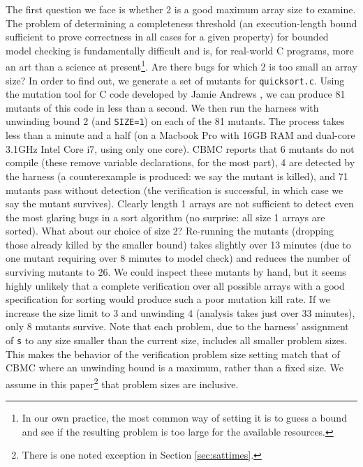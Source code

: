 \documentclass[conference]{IEEEtran}
\begin{document}
The first question we face is whether 2 is a good maximum array
size to examine.  The problem of determining a completeness
  threshold (an execution-length bound sufficient to prove correctness
in all cases for a given property) for bounded model checking is
fundamentally difficult \cite{CTDaniel} and is, for real-world C
programs, more an art than a science at present\footnote{In our own
  practice, the most common way of setting it is to guess a bound and
  see if the resulting problem is too large for the available
  resources.}.  Are there bugs for which 2 is too small
an array size?  In order to find out, we generate a set of mutants for
{\tt quicksort.c}.  Using the mutation tool for C code developed by
Jamie Andrews \cite{mutant}, we can produce 81 mutants of this code in
less than a second.  We then run the harness with unwinding bound 2
(and {\tt SIZE=1}) on each of the 81 mutants.  The process takes less
than a minute and a half (on a Macbook Pro with 16GB RAM and dual-core 3.1GHz Intel
Core i7, using only one core).  CBMC reports that 6 mutants do not
compile (these remove variable declarations, for the most part), 4 are
detected by the harness (a counterexample is produced: we say the
mutant is killed), and 71 mutants pass without detection (the
verification is successful, in which case we say the mutant survives).
Clearly length 1 arrays are not sufficient to detect even the most
glaring bugs in a sort algorithm (no surprise: all size 1 arrays are
sorted).  What about our choice of size 2?  Re-running the mutants
(dropping those already killed by the smaller bound) takes slightly
over 13 minutes (due to one mutant requiring over 8 minutes
to model check) and reduces the number of surviving mutants to 26.  We
could inspect these mutants by hand, but it seems highly unlikely that
a complete verification over all possible arrays with a good
specification for sorting would produce such a poor mutation kill rate.
If we increase the size limit to 3 and unwinding 4 (analysis takes just over 33
minutes), only 8 mutants survive.  Note that each problem, due to the
harness' assignment of {\tt s} to any size smaller than the current
size, includes all smaller problem sizes. This makes the behavior of
the verification problem size setting match that of CBMC where an unwinding bound is a maximum, rather than
a fixed size.  We assume in this paper\footnote{There is
  one noted exception in Section \ref{sec:sattimes}.} that
problem sizes are inclusive.
\end{document}
